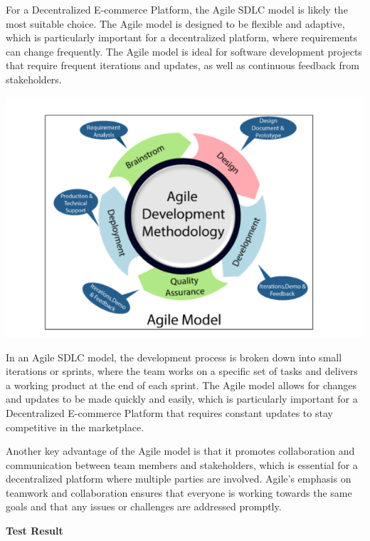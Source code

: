 \documentclass[a4paper,11pt]{article}
\begin{document}
\begin{center}
For a Decentralized E-commerce Platform, the Agile SDLC model is likely the most suitable choice. The Agile model is designed to be flexible and adaptive, which is particularly important for a decentralized platform, where requirements can change frequently. The Agile model is ideal for software development projects that require frequent iterations and updates, as well as continuous feedback from stakeholders.

\includegraphics[scale=0.5]{Screenshot from 2023-05-15 19-51-13.png}


\newpage


In an Agile SDLC model, the development process is broken down into small iterations or sprints, where the team works on a specific set of tasks and delivers a working product at the end of each sprint. The Agile model allows for changes and updates to be made quickly and easily, which is particularly important for a Decentralized E-commerce Platform that requires constant updates to stay competitive in the marketplace.\\

\vspace{0.5cm}

Another key advantage of the Agile model is that it promotes collaboration and communication between team members and stakeholders, which is essential for a decentralized platform where multiple parties are involved. Agile's emphasis on teamwork and collaboration ensures that everyone is working towards the same goals and that any issues or challenges are addressed promptly.


\vspace{1cm}

\begin{center}
    \textbf{\Large Test Result }
    \vspace{1cm}


\end{center}
\end{center}
\end{document}
